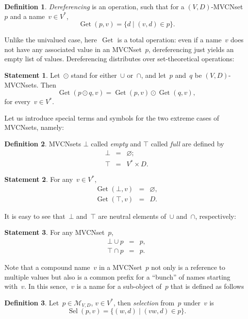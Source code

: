 \documentclass{article}
\theoremstyle{definition}
\newtheorem{Df}{Definition}
\newtheorem{St}{Statement}
\newcommand{\setcharmvcn}{M}
\newcommand{\setsymbol}[3]{\mathcal{#1}_{#2,#3}}
\newcommand{\setmvcn}[2]{\setsymbol{\setcharmvcn}{#1}{#2}}
\newcommand{\select}{\operatorname{Sel}}
\newcommand{\deref}{\operatorname{Get}}
\begin{document}
\begin{Df}\label{df:mvcn-dereferencing}
\emph{Dereferencing} is an operation, such that for
a $(V,D)$-MVCNset~$p$ and a name~$v\in V^\ast$,
\[
  \deref(p, v) = \{ d \mid (v, d) \in p \} .
\]
\end{Df}

Unlike the univalued case, here~$\deref$ is a total operation: even if a
name~$v$ does not have any associated value in an MVCNset~$p$, dereferencing
just yields an empty list of values.  Dereferencing distributes over
set-theoretical operations:
\begin{St}\label{st:mvcn-deref-distributivity}
Let~$\odot$ stand for either~$\cup$ or~$\cap$, and let~$p$ and~$q$ be
$(V,D)$-MVCNsets. Then
\[
  \deref(p\odot q, v) = \deref(p, v) \odot \deref(q, v) ,
\]
for every~$v\in V^\ast$.
\end{St}

Let us introduce special terms and symbols for the two extreme cases of
MVCNsets, namely:
\begin{Df}\label{df:mvcn-extremes}
MVCNsets $\bot$ called \emph{empty} and $\top$ called \emph{full} are defined by
\begin{eqnarray*}
  \bot &  = &  \varnothing ; \\
  \top &  = &  V^\ast \times D .
\end{eqnarray*}
\end{Df}

\begin{St}\label{st:mvcn-extreme-deref}
For any~$v\in V^\ast$,
\begin{eqnarray*}
  \deref(\bot, v) & = & \varnothing, \\
  \deref(\top, v) & = & D .
\end{eqnarray*}
\end{St}

It is easy to see that~$\bot$ and~$\top$ are neutral elements
of~$\cup$ and~$\cap$, respectively:
\begin{St}\label{st:mvcn-neutrals}
For any MVCNset~$p$,
\begin{eqnarray*}
  \bot \cup p & = & p, \\
  \top \cap p & = & p .
\end{eqnarray*}
\end{St}

Note that a compound name~$v$ in a MVCNset~$p$ not only is a reference to
multiple values but also is a common prefix for a ``bunch'' of names starting
with~$v$. In this sence,~$v$ is a name for a sub-object of~$p$ that is
defined as follows
\begin{Df}\label{df:mvcn-select}
Let~$p\in\setmvcn{V}{D}$, $v\in V^\ast$, then \emph{selection} from~$p$
under~$v$ is
\[
  \select(p,v) = \{ (w, d) \mid (vw, d)\in p \} .
\]
\end{Df}
\end{document}
